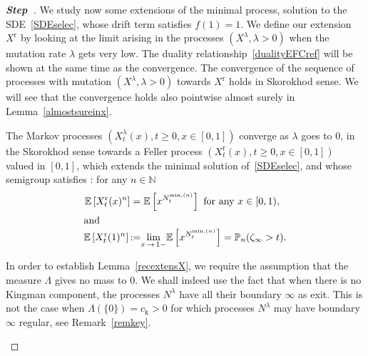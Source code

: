 \documentclass[AHL,Unicode,longabstracts,published]{cedram}
\newcommand{\rmr}{\mathrm{r}}
\newcommand{\rmk}{\mathrm{k}}
\newcommand{\bbN}{\mathbb{N}}
\newcommand{\bbE}{\mathbb{E}}
\newcommand{\bbP}{\mathbb{P}}
\newcounter{stepcount}
\newenvironment{step}{\refstepcounter{stepcount}\begin{proof}[\textbf{Step~\thestepcount}]}{\end{proof}}
\begin{document}
\begin{step}
 We study now some extensions of the minimal process, solution to the SDE~\eqref{SDEselec}, whose drift term satisfies $f(1)=1$. We define our extension $X^{\rmr}$ by looking at the limit arising in the processes $(X^{\lambda},\lambda>0)$ when the mutation rate $\lambda$ gets very low. The duality relationship~\eqref{dualityEFCref} will be shown at the same time as the convergence. The convergence of the sequence of processes with mutation $(X^{\lambda},\lambda>0)$ towards $X^{\rmr}$ holds in Skorokhod sense. We will see that the convergence holds also pointwise almost surely in Lemma~\ref{almostsureinx}.


\begin{lemm}\label{recextensX}
The Markov processes $(X^{\lambda}_t(x),t\geq 0, x\in [0,1])$ converge as $\lambda$ goes to $0$, in the Skorokhod sense towards a Feller process $(X_t^{\rmr}(x),t\geq 0,x\in [0,1])$ valued in $[0,1]$, which extends the minimal solution of~\eqref{SDEselec}, and whose semigroup satisfies : for any $n\in \bbN$
\begin{align}
\bbE\left[X^{\rmr}_t(x)^n\right] &=\bbE\left[x^{N^{\min,(n)}_t}\right]
\text{ for any } x\in [0,1),\label{dualabso}
\\
\intertext{and}
\bbE\left[X^{\rmr}_t(1)^n\right]\, &{:=}\underset{x\,\rightarrow\,1-}{\lim}\bbE\left[x^{N^{\min,(n)}_t}\right]=\bbP_n(\zeta_\infty>t).\label{entrancelawXr}
\end{align}
\end{lemm}

\begin{rema}\label{remwhynotkingman}
In order to establish Lemma~\ref{recextensX}, we require the assumption that the measure $\Lambda$ gives no mass to $0$. We shall indeed use the fact that when there is no Kingman component, the processes $N^{\lambda}$ have all their boundary $\infty$ as exit. This is not the case when $\Lambda(\{0\})=c_{\rmk}>0$ for which processes $N^{\lambda}$ may have boundary $\infty$ regular, see Remark~\ref{remkey}.
\end{rema}


\end{step}
\end{document}
